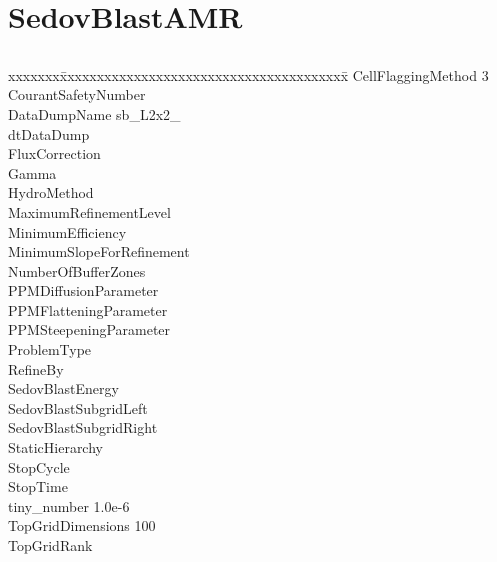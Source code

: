 \documentclass{book}
\begin{document}
\subsection{\cello}

\section{SedovBlastAMR} \label{s:SedovBlastAMR}

\subsection{\enzo}

{\parametersize
\begin{tabbing}
xxxxxxx\=xxxxxxxxxxxxxxxxxxxxxxxxxxxxxxxxxxxxxxx\=\kill
\> CellFlaggingMethod         3      \\
\> CourantSafetyNumber             \\
\> DataDumpName              \> sb\_L2x2\_ \\
\> dtDataDump                 \\
\> FluxCorrection             \\
\> Gamma                      \\
\> HydroMethod                       \\
\> MaximumRefinementLevel     \\
\> MinimumEfficiency               \\
\> MinimumSlopeForRefinement  \\
\> NumberOfBufferZones        \\
\> PPMDiffusionParameter             \\
\> PPMFlatteningParameter     \\
\> PPMSteepeningParameter     \\
\> ProblemType                       \\
\> RefineBy                   \\
\> SedovBlastEnergy           \\
\> SedovBlastSubgridLeft      \\
\> SedovBlastSubgridRight     \\
\> StaticHierarchy                   \\
\> StopCycle                  \\
\> StopTime                   \\
\> tiny\_number               \> 1.0e-6 \\
\> TopGridDimensions          100 \\
\> TopGridRank               
\end{tabbing}}
\end{document}
